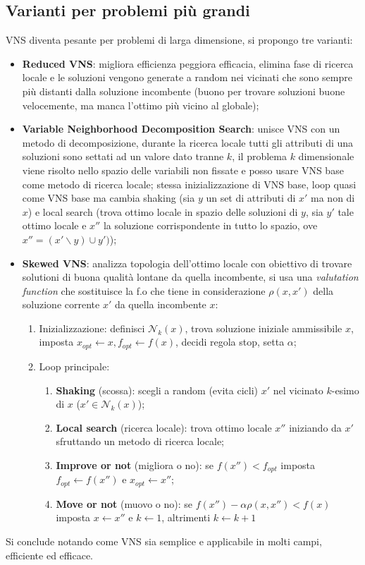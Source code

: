 \subsection{Varianti per problemi più grandi}
VNS diventa pesante per problemi di larga dimensione, si propongo tre varianti:
\begin{itemize}
	\item \textbf{Reduced VNS}: migliora efficienza peggiora efficacia, elimina fase di ricerca locale e le soluzioni vengono generate a random nei vicinati che sono sempre più distanti dalla soluzione incombente (buono per trovare soluzioni buone velocemente, ma manca l'ottimo più vicino al globale);
	\item \textbf{Variable Neighborhood Decomposition Search}: unisce VNS con un metodo di decomposizione, durante la ricerca locale tutti gli attributi di una soluzioni sono settati ad un valore dato tranne $k$, il problema $k$ dimensionale viene risolto nello spazio delle variabili non fissate e posso usare VNS base come metodo di ricerca locale; stessa inizializzazione di VNS base, loop quasi come VNS base ma cambia shaking (sia $y$ un set di attributi di $x'$ ma non di $x$) e local search (trova ottimo locale in spazio delle soluzioni di $y$, sia $y'$ tale ottimo locale e $x''$ la soluzione corrispondente in tutto lo spazio, ove $x''=(x'\backslash y)\cup y')$);
	\item \textbf{Skewed VNS}: analizza topologia dell'ottimo locale con obiettivo di trovare solutioni di buona qualità lontane da quella incombente, si usa una \textit{valutation function} che sostituisce la f.o che tiene in considerazione $\rho(x,x')$ della soluzione corrente $x'$ da quella incombente $x$:
	\begin{enumerate}
		\item Inizializzazione: definisci $\mathcal{N}_k(x)$, trova soluzione iniziale ammissibile $x$, imposta $x_{opt}\leftarrow x, f_{opt}\leftarrow f(x)$, decidi regola stop, setta $\alpha$;
		\item Loop principale: 
		\begin{enumerate}
			\item \textbf{Shaking} (scossa): scegli a random (evita cicli) $x'$ nel vicinato $k$-esimo di $x$ ($x'\in \mathcal{N}_k(x)$);
			\item \textbf{Local search} (ricerca locale): trova ottimo locale $x''$ iniziando da $x'$ sfruttando un metodo di ricerca locale;
			\item \textbf{Improve or not} (migliora o no): se $f(x'')<f_{opt}$ imposta $f_{opt}\leftarrow f(x'')$ e $x_{opt}\leftarrow x''$;
			\item \textbf{Move or not} (muovo o no): se $f(x'')-\alpha \rho (x,x'')<f(x)$ imposta $x\leftarrow x''$ e  $k\leftarrow 1$, altrimenti $k\leftarrow k+1$
		\end{enumerate}
	\end{enumerate}
\end{itemize}

Si conclude notando come VNS sia semplice e applicabile in molti campi, efficiente ed efficace. 
